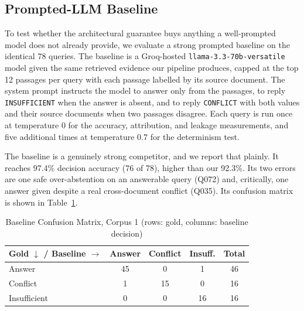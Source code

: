 \documentclass[conference]{IEEEtran}
\begin{document}
\subsection{Prompted-LLM Baseline}
\label{sec:baseline}
To test whether the architectural guarantee buys anything a well-prompted
model does not already provide, we evaluate a strong prompted baseline on
the identical 78 queries. The baseline is a Groq-hosted
\texttt{llama-3.3-70b-versatile} model given the same retrieved evidence our
pipeline produces, capped at the top 12 passages per query with each
passage labelled by its source document. The system prompt instructs the
model to answer only from the passages, to reply \texttt{INSUFFICIENT} when
the answer is absent, and to reply \texttt{CONFLICT} with both values and
their source documents when two passages disagree. Each query is run once at
temperature 0 for the accuracy, attribution, and leakage measurements, and
five additional times at temperature 0.7 for the determinism test.

The baseline is a genuinely strong competitor, and we report that plainly.
It reaches 97.4\% decision accuracy (76 of 78), higher than our 92.3\%. Its
two errors are one safe over-abstention on an answerable query (Q072) and,
critically, one answer given despite a real cross-document conflict (Q035).
Its confusion matrix is shown in Table~\ref{tab:baseline_confusion}.

\begin{table}[htbp]
\caption{Baseline Confusion Matrix, Corpus 1 (rows: gold, columns: baseline decision)}
\label{tab:baseline_confusion}
\centering
\small
\begin{tabularx}{\columnwidth}{@{}l *{3}{c} c@{}}
\toprule
Gold $\downarrow$ / Baseline $\rightarrow$ & Answer & Conflict & Insuff. & Total \\
\midrule
Answer        & 45 & 0  & 1  & 46 \\
Conflict      & 1  & 15 & 0  & 16 \\
Insufficient  & 0  & 0  & 16 & 16 \\
\bottomrule
\end{tabularx}
\end{table}
\end{document}
